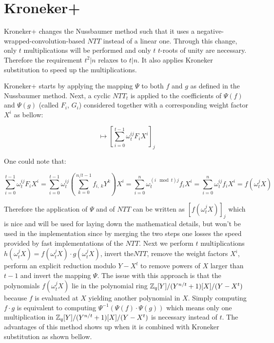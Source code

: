 \chapter{Kroneker+}\label{chapter:kroneker_plus}

Kroneker+ \parencite{cryptoeprint:2020/1303} changes the Nussbaumer method such that it uses a negative-wrapped-convolution-based $NTT$ instead of a linear one. Through this change, only $t$ multiplications will be performed and only $t$ $t$-roots of unity are necessary. Therefore the requirement $t^2 | n$ relaxes to $t | n$. It also applies Kroneker substitution to speed up the multiplications.

Kroneker+ starts by applying the mapping $\Psi$ to both $f$ and $g$ as defined in the Nussbaumer method. Next, a cyclic $NTT_t$ is applied to the coefficients of $\Psi(f)$ and $\Psi(g)$ (called $F_i$, $G_i$) considered together with a corresponding weight factor $X^i$ as bellow:

\begin{equation*}
    [F_0 X^0, \ldots, F_{t - 1} X^{t-1}] \mapsto [\sum_{i=0}^{t-1} \omega_t^{ij} F_i X^i]_j
\end{equation*}

One could note that:

\begin{equation*}
    \sum_{i=0}^{t-1} \omega_t^{ij} F_i X^i = \sum_{i=0}^{t-1} \omega_t^{ij} (\sum_{k=0}^{n/t-1} f_{i,\ k} Y^k) X^i = \sum_{i=0}^{n} \omega_t^{(i \mod t) j} f_i X^i = \sum_{i=0}^{n} \omega_t^{ij} f_i X^i = f(\omega_t^j X)
\end{equation*}

Therefore the application of $\Psi$ and of $NTT$ can be written as $[f(\omega_t^j X)]_j$ which is nice and will be used for laying down the mathematical details, but won't be used in the implementation since by merging the two steps one losses the speed provided by fast implementations of the $NTT$. Next we perform $t$ multiplications $h(\omega_t^j X) = f(\omega_t^j X) \cdot g(\omega_t^j X)$, invert the$NTT$, remove the weight factors $X^i$, perform an explicit reduction modulo $Y - X^t$ to remove powers of $X$ larger than $t-1$ and invert the mapping $\Psi$. The issue with this approach is that the polynomials $f(\omega_t^j X)$ lie in the polynomial ring $\mathbb{Z}_q[Y]/(Y^{n/t} + 1)[X]/(Y-X^t)$ because $f$ is evaluated at $X$ yielding another polynomial in $X$. Simply computing $f \cdot g$ is equivalent to computing $\Psi^{-1}(\Psi(f) \cdot \Psi(g))$ which means only one multiplication in $\mathbb{Z}_q[Y]/(Y^{n/t} + 1)[X]/(Y-X^t)$ is necessary instead of $t$. The advantages of this method shows up when it is combined with Kroneker substitution as shown bellow.


